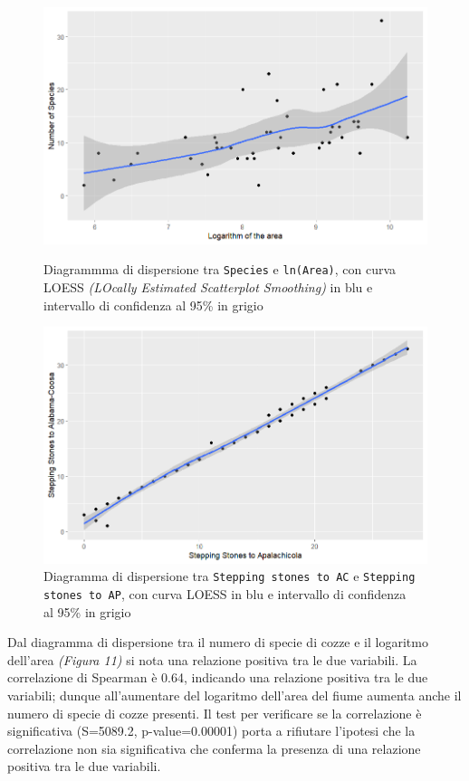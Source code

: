 \documentclass{article} %
\begin{document}
\begin{figure}[H]
    \centering
    \begin{minipage}{0.49\textwidth}
        \centering
        \includegraphics[width=\textwidth]{immagini/sp_ln.png}
        \captionsetup{justification=centering}
        \caption{Diagrammma di dispersione tra \texttt{Species} e \texttt{ln(Area)}, con curva LOESS \textit{(LOcally Estimated Scatterplot Smoothing)} in blu e intervallo di confidenza al 95\% in grigio}
    \end{minipage}
    \hfill
    \begin{minipage}{0.49\textwidth}
        \centering
        \includegraphics[width=\textwidth]{immagini/ac_ap.png}
        \captionsetup{justification=centering}
        \caption{Diagramma di dispersione tra \texttt{Stepping stones to AC} e \texttt{Stepping stones to AP}, con curva LOESS in blu e intervallo di confidenza \\al 95\% in grigio}
    \end{minipage}
\end{figure}
Dal diagramma di dispersione tra il numero di specie di cozze e il logaritmo dell'area \textit{(Figura 11)} si nota una relazione positiva tra le due variabili.  
La correlazione di Spearman è 0.64, indicando una relazione positiva tra le due variabili; dunque all'aumentare del logaritmo dell'area del fiume aumenta anche il numero di specie di cozze presenti.
Il test per verificare se la correlazione è significativa (S=5089.2, p-value=0.00001) porta a rifiutare l'ipotesi che la correlazione non sia significativa che conferma la presenza di una relazione positiva tra le due variabili.
\end{document}
